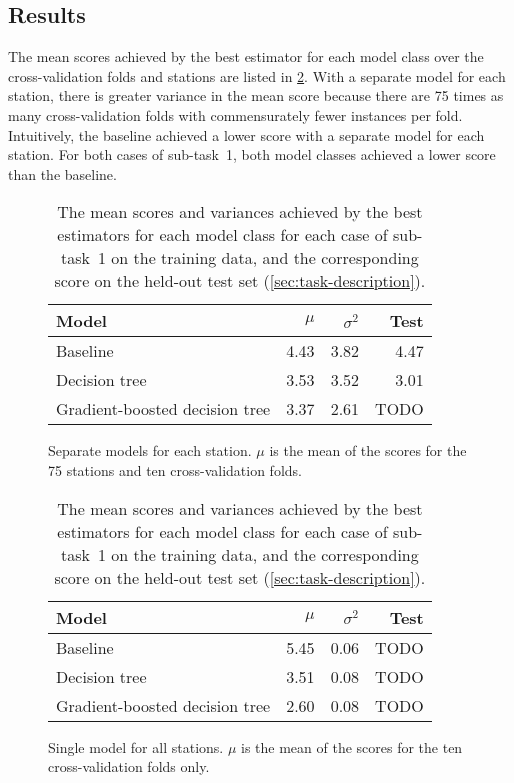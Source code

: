 \documentclass[11pt]{extarticle}
\begin{document}
\subsection{Results}
\label{sec:subtask-1:results}

The mean scores achieved by the best estimator for each model class over the
cross-validation folds and stations are listed in \cref{tab:subtask-1:results}.
With a separate model for each station, there is greater variance in the mean score
because there are 75 times as many cross-validation folds with commensurately fewer
instances per fold.
Intuitively, the baseline achieved a lower score with a separate model for each
station.
For both cases of sub-task~1, both model classes achieved a lower score than the
baseline.

\begin{table}
  \centering
  \begin{subfigure}{\textwidth}
    \centering
    \begin{tabular}{lrrr}
      \toprule
      Model                          & $\mu$ & $\sigma^2$ & Test
      \\
      \midrule
      Baseline                       & 4.43  & 3.82       & 4.47
      \\
      Decision tree                  & 3.53  & 3.52       & 3.01
      \\
      Gradient-boosted decision tree & 3.37  & 2.61       & TODO
      \\
      \bottomrule
    \end{tabular}
    \caption{Separate models for each station. $\mu$ is the mean of the scores for the 75 stations
      and ten cross-validation folds.}
    \label{tab:subtask-1:results-1}
  \end{subfigure}
  \par\bigskip\bigskip
  \begin{subfigure}{\textwidth}
    \centering
    \begin{tabular}{lrrr}
      \toprule
      Model                          & $\mu$ & $\sigma^2$ & Test
      \\
      \midrule
      Baseline                       & 5.45  & 0.06       & TODO
      \\
      Decision tree                  & 3.51  & 0.08       & TODO
      \\
      Gradient-boosted decision tree & 2.60  & 0.08       & TODO
      \\
      \bottomrule
    \end{tabular}
    \caption{Single model for all stations. $\mu$ is the mean of the scores for the ten
      cross-validation folds only.}
    \label{tab:subtask-1:results-2}
  \end{subfigure}
  \caption{The mean scores and variances achieved by the best estimators for each model
    class for each case of sub-task~1 on the training data, and the corresponding score
    on the held-out test set (\cref{sec:task-description}).
  }
  \label{tab:subtask-1:results}
\end{table}
\end{document}
